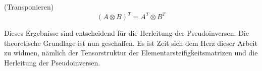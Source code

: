 \begin{Lemma} (Transponieren) \label{lemma:transpose} \\
\begin{equation*}
(A \otimes B)^T=A^T \otimes B^T
\end{equation*}
\end{Lemma}

Dieses Ergebnisse sind entscheidend für die Herleitung der Pseudoinversen. Die theoretische Grundlage ist nun geschaffen. Es ist Zeit sich dem Herz dieser Arbeit zu widmen, nämlich der Tensorstruktur der Elementarsteifigkeitsmatrizen und die Herleitung der Pseudoinversen.

